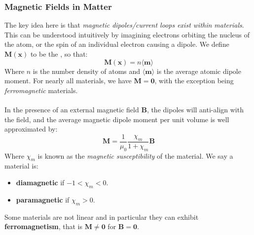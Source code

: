 \documentclass[a4paper]{article}
\numberwithin{equation}{section}
\begin{document}
\subsubsection{Magnetic Fields in Matter}
The key idea here is that \textit{magnetic dipoles/current loops exist within materials}. This can be understood intuitively by imagining electrons orbiting the nucleus of the atom, or the spin of an individual electron causing a dipole. We define $\mathbf{M}(\mathbf{x})$ to be the , so that:
\begin{equation}
\mathbf{M}(\mathbf{x})=n \langle \mathbf{m} \rangle
\end{equation}
Where $n$ is the number density of atoms and $\langle \mathbf{m} \rangle$ is the average atomic dipole moment. For nearly all materials, we have $\mathbf{M}=\mathbf{0}$, with the exception being \textit{ferromagnetic} materials.\\
\\
In the presence of an external magnetic field $\mathbf{B}$, the dipoles will anti-align with the field, and the average magnetic dipole moment per unit volume is well approximated by:
\begin{equation} \label{lin mag}
\mathbf{M}=\frac{1}{\mu_0} \frac{\chi_m}{1+\chi_m} \mathbf{B}
\end{equation}
Where $\chi_m$ is known as the \textit{magnetic susceptibility} of the material. We say a material is:
\begin{itemize}
	\item \textbf{diamagnetic} if $-1 < \chi_m < 0$.
	\item \textbf{paramagnetic}  if $\chi_m>0$.
\end{itemize}
Some materials are not linear and in particular they can exhibit \textbf{ferromagnetism}, that is $\mathbf{M} \neq \mathbf{0}$ for $\mathbf{B}=\mathbf{0}$.
\end{document}

